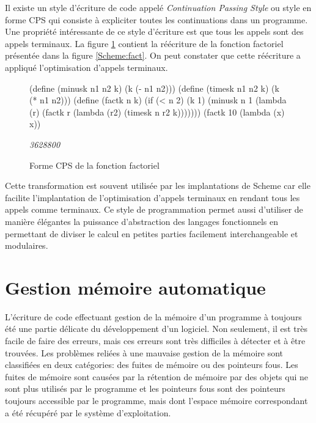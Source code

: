\documentclass[12pt,oneside,letterpaper,francais]{book}
\newcommand{\schemeresult}[1]{{\it #1}}
\begin{document}
Il existe un style d'écriture de code appelé \textit{Continuation
  Passing Style} ou style en forme CPS qui consiste à expliciter
toutes les continuations dans un programme. Une propriété intéressante
de ce style d'écriture est que tous les appels sont des appels
terminaux. La figure \ref{Scheme:cps-fact} contient la réécriture de
la fonction factoriel présentée dans la figure \ref{Scheme:fact}. On
peut constater que cette réécriture a appliqué l'optimisation d'appels
terminaux.

\begin{figure}[htb!]
  \begin{schemecode}
(define (minusk n1 n2 k) (k (- n1 n2)))
(define (timesk n1 n2 k) (k (* n1 n2)))
(define (factk n k)
  (if (< n 2)
      (k 1)
      (minusk n 1 (lambda (r)
                    (factk r (lambda (r2)
                               (timesk n r2 k)))))))
(factk 10 (lambda (x) x))
  \end{schemecode}
  \schemeresult{3628800}
  \caption{Forme CPS de la fonction factoriel}
  \label{Scheme:cps-fact}
\end{figure}

Cette transformation est souvent utilisée par les implantations de
Scheme car elle facilite l'implantation de l'optimisation d'appels
terminaux en rendant tous les appels comme terminaux. Ce style de
programmation permet aussi d'utiliser de manière élégantes la
puissance d'abstraction des langages fonctionnels en permettant de
diviser le calcul en petites parties facilement interchangeable et
modulaires.





\section{Gestion mémoire automatique}

L'écriture de code effectuant gestion de la mémoire d'un programme à
toujours été une partie délicate du développement d'un logiciel. Non
seulement, il est très facile de faire des erreurs, mais ces erreurs
sont très difficiles à détecter et à être trouvées. Les problèmes
reliées à une mauvaise gestion de la mémoire sont classifiées en deux
catégories: des fuites de mémoire ou des pointeurs fous. Les fuites de
mémoire sont causées par la rétention de mémoire par des objets qui ne
sont plus utilisés par le programme et les pointeurs fous sont des
pointeurs toujours accessible par le programme, mais dont l'espace
mémoire correspondant a été récupéré par le système d'exploitation.
\end{document}
